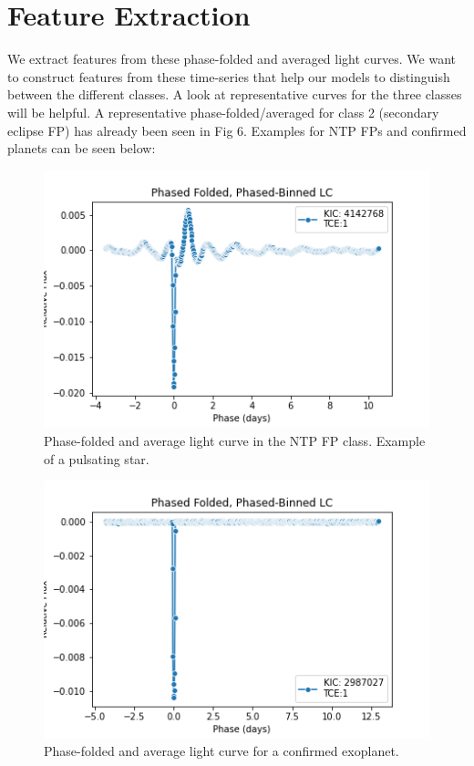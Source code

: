 \documentclass{article}
\begin{document}
\section{Feature Extraction}
We extract features from these phase-folded and averaged light curves. We want to construct features from these time-series that help our models to distinguish between the different classes. A look at representative curves for the three classes will be helpful. A representative phase-folded/averaged for class 2 (secondary eclipse FP) has already been seen in Fig 6. Examples for NTP FPs and confirmed planets can be seen below:
 \begin{figure}[H]
	\begin{center}
		\includegraphics[totalheight=5cm]{figures/phasefolded_ntp_ex2.png}
	\end{center}
	\caption{Phase-folded and average light curve in the NTP FP class. Example of a pulsating star.}
\end{figure}
 \begin{figure}[H]
	\begin{center}
		\includegraphics[totalheight=5cm]{figures/phasefolded_CP_ex1.png}
	\end{center}
	\caption{Phase-folded and average light curve for a confirmed exoplanet.}
\end{figure}
\end{document}
